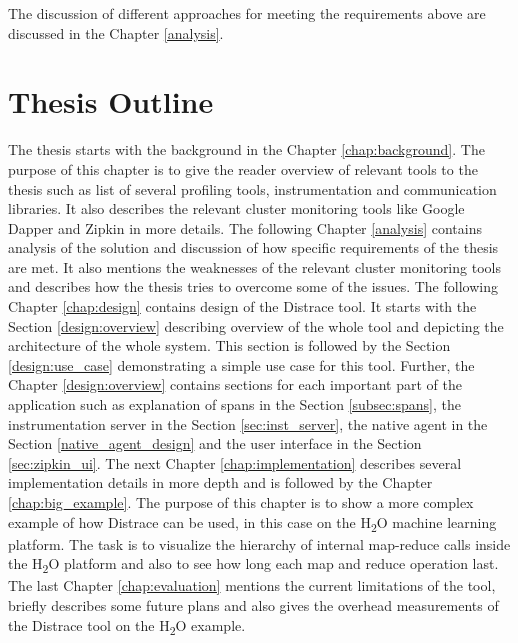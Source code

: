 The discussion of different approaches for meeting the requirements above are discussed in the Chapter \ref{analysis}.

\section{Thesis Outline}
The thesis starts with the background in the Chapter \ref{chap:background}. The purpose of this chapter is to give the reader overview of relevant tools to the thesis such as list of several profiling tools, instrumentation and communication libraries. It also describes the relevant cluster monitoring tools like Google Dapper and Zipkin in more details. The following Chapter \ref{analysis} contains analysis of the solution and discussion of how specific requirements of the thesis are met. It also mentions the weaknesses of the relevant cluster monitoring tools and describes how the thesis tries to overcome some of the issues. The following Chapter \ref{chap:design} contains design of the Distrace tool. It starts with the Section \ref{design:overview} describing overview of the whole tool and depicting the architecture of the whole system. This section is followed by the Section \ref{design:use_case} demonstrating a simple use case for this tool. Further, the Chapter \ref{design:overview} contains sections for each important part of the application such as explanation of spans in the Section \ref{subsec:spans}, the instrumentation server in the Section \ref{sec:inst_server}, the native agent in the Section \ref{native_agent_design} and the user interface in the Section \ref{sec:zipkin_ui}. The next Chapter \ref{chap:implementation} describes several implementation details in more depth and is followed by the Chapter \ref{chap:big_example}. The purpose of this chapter is to show a more complex example of how Distrace can be used, in this case on the H\textsubscript{2}O machine learning platform. The task is to visualize the hierarchy of internal map-reduce calls inside the H\textsubscript{2}O platform and also to see how long each map and reduce operation last. The last Chapter \ref{chap:evaluation} mentions the current limitations of the tool, briefly describes some future plans and also gives the overhead measurements of the Distrace tool on the H\textsubscript{2}O example. 
